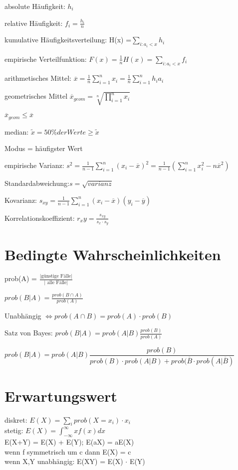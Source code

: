 absolute Häufigkeit: $h_i$

relative Häufigkeit: $f_i= \frac{h_i}{n}$

kumulative Häufigkeitsverteilung: H(x) =$\sum_{i:a_i < x} h_i$

empirische Verteilfunktion: $F(x) =  \frac{1}{n} H(x) = \sum_{i:a_i < x} f_i$

arithmetisches Mittel: $\overline{x} = \frac{1}{n} \sum_{i=1}^n x_i = \frac{1}{n} \sum_{i=1}^n h_i a_i $

geometrisches Mittel $\overline{x}_{geom} = \sqrt[n]{\prod_{i=1}^n x_i}$

$\overline{x}_{geom} \leq \overline{x}$

median:  $\tilde{x} = 50\% der Werte \geq \tilde{x} $


Modus = häufigster Wert

empirische Varianz: $s^2 = \frac{1}{n-1}\sum_{i=1}^n(x_i-\overline{x})^2 = \frac{1}{n-1}\left(\sum_{i=1}^n x_i^2-n\overline{x}^2\right)$

Standardabweichung:$s = \sqrt{varianz} $

Kovarianz: $s_{xy} = \frac{1}{n-1}\sum_{i=1}^n(x_i-\overline{x})(y_i-\overline{y})$

Korrelationskoeffizient: $r_xy = \frac{s_{xy}}{s_x\cdot s_y}$

\section*{Bedingte Wahrscheinlichkeiten}

prob(A) = $\frac{\text{|günstige Fälle|}}{\text{| alle Fälle|}}$

$prob(B|A) = \frac{prob(B \cap A)}{prob(A)}$

Unabhängig $\Leftrightarrow prob(A \cap B)=prob(A)\cdot prob(B)$

Satz von Bayes: $prob(B|A) = prob(A|B)\frac{prob(B)}{prob(A)}$

$prob(B|A) = prob(A|B)\dfrac{prob(B)}{prob(B)\cdot prob(A|B) + prob(\overline{B} \cdot prob(A|\overline{B}) }$


\section*{Erwartungswert}
diskret: $ E(X) = \sum_i prob(X=x_i)\cdot x_i$\\
stetig: $E(X) = \int_{-\infty}^{\infty}xf(x)dx$\\

E(X+Y) = E(X) + E(Y); E(aX) = aE(X) \\
wenn f symmetrisch um c dann E(X) = c\\
wenn X,Y unabhängig: E(XY) = E(X) $\cdot$ E(Y)

